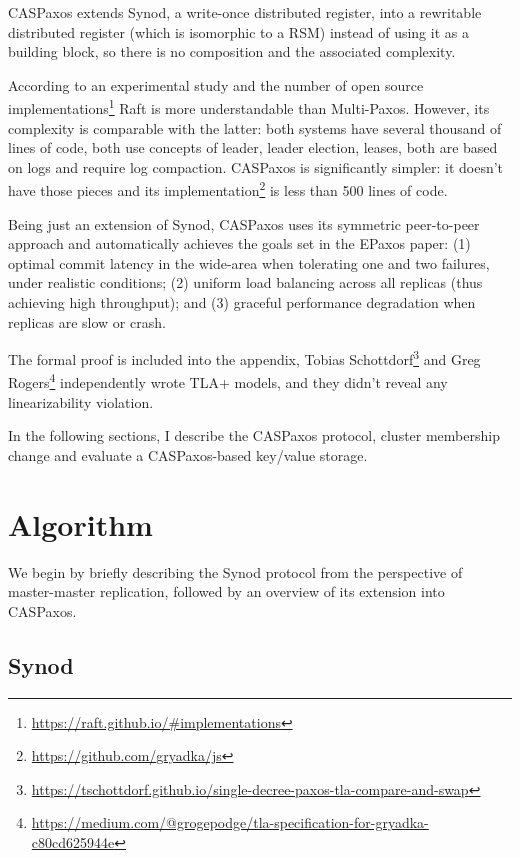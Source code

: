\documentclass[12pt]{article}
\begin{document}
CASPaxos extends Synod, a write-once distributed register, into a rewritable distributed register (which is isomorphic to a RSM) instead of using it as a building block, so there is no composition and the associated complexity.

According to an experimental study\cite{raft} and the number of open source implementations\footnote{\href{https://raft.github.io/\#implementations}{https://raft.github.io/\#implementations}} Raft is more understandable than Multi-Paxos. However, its complexity is comparable with the latter: both systems\cite{chubby}\cite{raft} have several thousand of lines of code, both use concepts of leader, leader election, leases, both are based on logs and require log compaction. CASPaxos is significantly simpler: it doesn't have those pieces and its implementation\footnote{\href{https://github.com/gryadka/js}{https://github.com/gryadka/js}} is less than 500 lines of code.

Being just an extension of Synod, CASPaxos uses its symmetric peer-to-peer approach and automatically achieves the goals set in the EPaxos\cite{epaxos} paper: (1) optimal commit latency in the wide-area when tolerating one and two failures, under realistic conditions; (2) uniform load balancing across all replicas (thus achieving high throughput); and (3) graceful performance degradation when replicas are slow or crash.

The formal proof is included into the appendix, Tobias Schottdorf\footnote{\href{https://tschottdorf.github.io/single-decree-paxos-tla-compare-and-swap}{https://tschottdorf.github.io/single-decree-paxos-tla-compare-and-swap}} and Greg Rogers\footnote{\href{https://medium.com/@grogepodge/tla-specification-for-gryadka-c80cd625944e}{https://medium.com/@grogepodge/tla-specification-for-gryadka-c80cd625944e}} independently wrote TLA+ models, and they didn't reveal any linearizability violation.

In the following sections, I describe the CASPaxos protocol, cluster membership change and evaluate a CASPaxos-based key/value storage.

\section{Algorithm}

We begin by briefly describing the Synod protocol from the perspective of master-master replication, followed by an overview of its extension into CASPaxos.

\subsection{Synod}
\end{document}

